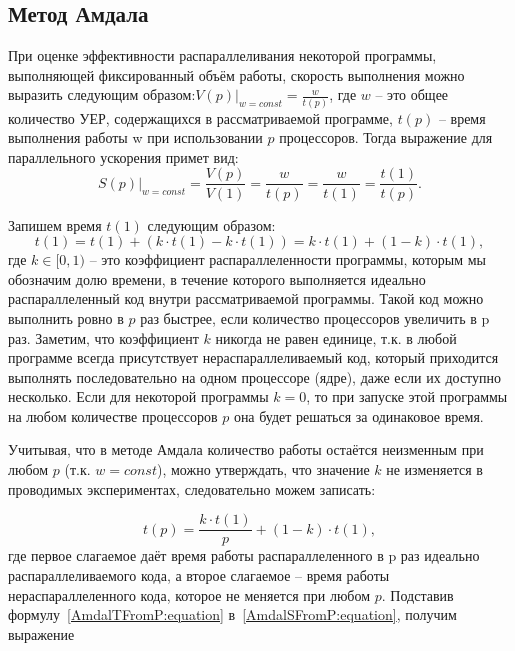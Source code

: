\subsection{Метод Амдала}

При оценке эффективности распараллеливания некоторой программы, выполняющей фиксированный объём работы, скорость выполнения можно выразить следующим образом:$\left.V(p)\right|_{w = const} = \frac{w}{t(p)}$, где $w$ – это общее количество УЕР, содержащихся в рассматриваемой программе, $t(p)$ – время выполнения работы w при использовании $p$ процессоров. Тогда выражение для параллельного ускорения примет вид:
\begin{equation}
    \label{AmdalSFromP:equation}
    \left.S(p)\right|_{w = const} = \frac{V(p)}{V(1)} = \frac{w}{t(p)} = \frac{w}{t(1)} = \frac{t(1)}{t(p)}.
\end{equation}

Запишем время $t(1)$ следующим образом:
\begin{equation}
    t(1) = t(1) + (k \cdot t(1) - k \cdot t(1)) = k \cdot t(1) + (1 - k) \cdot t(1),
\end{equation}
где $k \in [0,1)$ -- это коэффициент распараллеленности программы, которым мы обозначим долю времени, в течение которого выполняется идеально распараллеленный код внутри рассматриваемой программы. Такой код можно выполнить ровно в $p$ раз быстрее, если количество процессоров увеличить в p раз. Заметим, что коэффициент $k$ никогда не равен единице, т.к. в любой программе всегда присутствует нераспараллеливаемый код, который приходится выполнять последовательно на одном процессоре (ядре), даже если их доступно несколько. Если для некоторой программы $k=0$, то при запуске этой программы на любом количестве процессоров $p$ она будет решаться за одинаковое время.

Учитывая, что в методе Амдала количество работы остаётся неизменным при любом $p$ (т.к. $w=const$), можно утверждать, что значение $k$ не изменяется в проводимых экспериментах, следовательно можем записать:

\begin{equation}
    \label{AmdalTFromP:equation}
    t(p) = \frac{k \cdot t(1)}{p} + (1 - k) \cdot t(1),
\end{equation}
где первое слагаемое даёт время работы распараллеленного в p раз идеально распараллеливаемого кода, а второе слагаемое – время работы нераспараллеленного кода, которое не меняется при любом $p$. Подставив формулу~\eqref{AmdalTFromP:equation} в~\eqref{AmdalSFromP:equation}, получим выражение 

